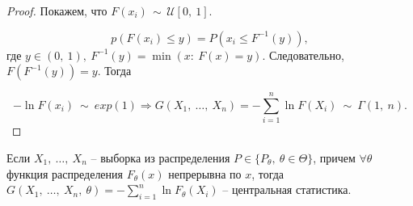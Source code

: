\begin{proof}
Покажем, что $\displaystyle F( x_{i}) \, \sim \, \mathcal{U}[ 0,\ 1]$.


\begin{equation*}
p( F( x_{i}) \leqslant y) =P\left( x_{i} \leqslant F^{-1}( y)\right) ,
\end{equation*}
где $\displaystyle y\in ( 0,\ 1) ,\ F^{-1}( y) =\min( x:\ F( x) =y)$. Следовательно, $\displaystyle F\left( F^{-1}( y)\right) =y$. Тогда


\begin{equation*}
-\ln F( x_{i}) \ \sim \ exp( 1) \Rightarrow G( X_{1} ,\ \dotsc ,\ X_{n}) =-\sum _{i=1}^{n}\ln F( X_{i}) \ \sim \ \Gamma ( 1,\ n) .
\end{equation*}
\end{proof}
\begin{corollary}
Если $\displaystyle X_{1} ,\ \dotsc ,\ X_{n}$ -- выборка из распределения $\displaystyle P\in \{P_{\theta } ,\ \theta \in \Theta \}$, причем $\displaystyle \forall \theta $ функция распределения $\displaystyle F_{\theta }( x)$ непрерывна по $\displaystyle x$, тогда $\displaystyle G( X_{1} ,\ \dotsc ,\ X_{n} ,\ \theta ) =-\sum _{i=1}^{n}\ln F_{\theta }( X_{i})$ -- центральная статистика.
\end{corollary}